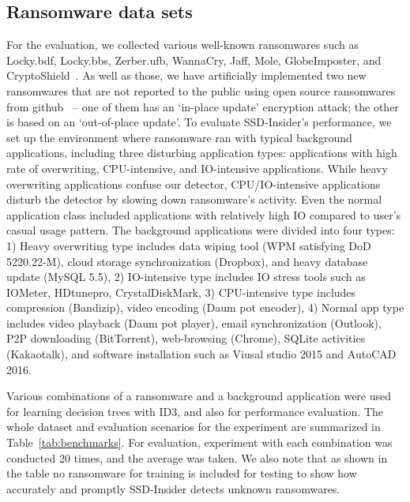 \documentclass[conference]{IEEEtran}
\newcommand{\ours}{SSD-Insider}
\begin{document}
\subsection{Ransomware data sets}
For the evaluation, we collected various well-known ransomwares
such as Locky.bdf, Locky.bbs, Zerber.ufb, WannaCry, Jaff, Mole,
GlobeImposter, and CryptoShield~\cite{virustotal}.  As well as
those, we have artificially implemented two new ransomwares that
are not reported to the public using open source ransomwares from
github~\cite{virgang,poc} -- one of them has an `in-place update'
encryption attack; the other is based on an `out-of-place update'.
To evaluate \ours{}'s performance, we set up the environment where
ransomware ran with typical background applications, including
three disturbing application types: applications with high rate of
overwriting, CPU-intensive, and IO-intensive applications. While
heavy overwriting applications confuse our detector,
CPU/IO-intensive applications disturb the detector by slowing down
ransomware's activity.  Even the normal application class included
applications with relatively high IO compared to user's casual
usage pattern.  The background applications were divided into four
types: 1) Heavy overwriting type includes data wiping tool (WPM
satisfying DoD 5220.22-M), cloud storage synchronization (Dropbox),
and heavy database update (MySQL 5.5), 2) IO-intensive type
includes IO stress tools such as IOMeter, HDtunepro,
CrystalDiskMark, 3) CPU-intensive type includes compression
(Bandizip), video encoding (Daum pot encoder), 4) Normal app type
includes video playback (Daum pot player), email synchronization
(Outlook), P2P downloading (BitTorrent), web-browsing (Chrome),
SQLite activities (Kakaotalk), and software installation such as
Viusal studio 2015 and AutoCAD 2016.

Various combinations of a ransomware and a background application
were used for learning decision trees with ID3, and also for
performance evaluation.  The whole dataset and evaluation scenarios
for the experiment are summarized in Table~\ref{tab:benchmarks}.
For evaluation, experiment with each combination was conducted 20
times, and the average was taken.  We also note that as shown in
the table no ransomware for training is included for testing to
show how accurately and promptly \ours{} detects unknown
ransomwares.
\end{document}
